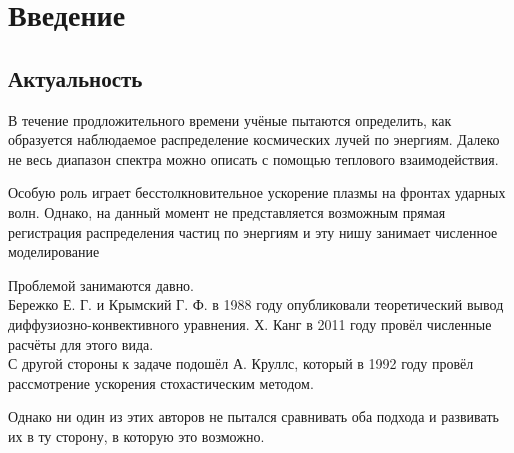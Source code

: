 \documentclass[a4paper,11pt]{article} %
\begin{document}
\tableofcontents
\newpage
\section{Введение}
\subsection{Актуальность}
В течение продложительного времени учёные пытаются определить, как образуется наблюдаемое распределение космических лучей по энергиям. Далеко не весь диапазон спектра можно описать с помощью теплового взаимодействия.

Особую роль играет бесстолкновительное ускорение плазмы на фронтах ударных волн. Однако, на данный момент не представляется возможным прямая регистрация распределения частиц по энергиям и эту нишу занимает численное моделирование

Проблемой занимаются давно.\\
 Бережко Е. Г. и Крымский Г. Ф. в 1988 году опубликовали теоретический вывод диффузиозно-конвективного уравнения. Х. Канг в 2011 году провёл численные расчёты для этого вида. \\ 
С другой стороны к задаче подошёл А. Круллс, который в 1992 году провёл рассмотрение ускорения стохастическим методом. 

Однако ни один из этих авторов не пытался сравнивать оба подхода и развивать их в ту сторону, в которую это возможно.

\end{document}
